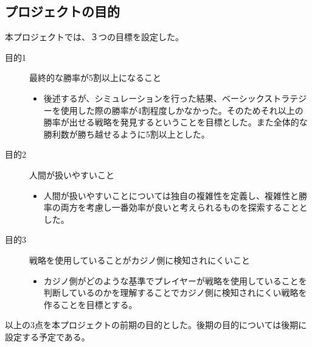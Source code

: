 \subsection{プロジェクトの目的}
本プロジェクトでは、３つの目標を設定した。
\begin{description}
\item[目的1] 最終的な勝率が5割以上になること
\begin{itemize}
\item{後述するが、シミュレーションを行った結果、ベーシックストラテジーを使用した際の勝率が4割程度しかなかった。そのためそれ以上の勝率が出せる戦略を発見するということを目標とした。また全体的な勝利数が勝ち越せるように5割以上とした。}
\end{itemize}
\item[目的2]人間が扱いやすいこと
\begin{itemize}
\item{人間が扱いやすいことについては独自の複雑性を定義し、複雑性と勝率の両方を考慮し一番効率が良いと考えられるものを探索することとした。}
\end{itemize}
\item[目的3]戦略を使用していることがカジノ側に検知されにくいこと
\begin{itemize}
\item{カジノ側がどのような基準でプレイヤーが戦略を使用していることを判断しているのかを理解することでカジノ側に検知されにくい戦略を作ることを目標とする。}
\end{itemize}
\end{description}
以上の3点を本プロジェクトの前期の目的とした。後期の目的については後期に設定する予定である。
